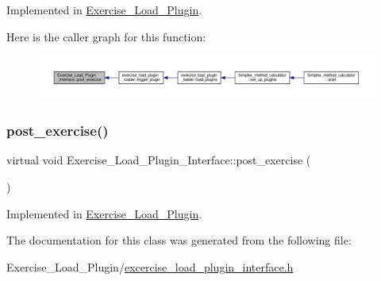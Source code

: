 Implemented in \hyperlink{classExercise__Load__Plugin_ad0c7c810dd492a014e17d40cdfe3d35d}{Exercise\+\_\+\+Load\+\_\+\+Plugin}.

Here is the caller graph for this function\+:\nopagebreak
\begin{figure}[H]
\begin{center}
\leavevmode
\includegraphics[width=350pt]{classExercise__Load__Plugin__Interface_abb9fef00080e48c6ce458b7476db97d9_icgraph}
\end{center}
\end{figure}
\mbox{\label{classExercise__Load__Plugin__Interface_abb9fef00080e48c6ce458b7476db97d9}} 
\subsubsection{\texorpdfstring{post\+\_\+exercise()}{post\_exercise()}\hspace{0.1cm}{\footnotesize\ttfamily [2/2]}}
{\footnotesize\ttfamily virtual void Exercise\+\_\+\+Load\+\_\+\+Plugin\+\_\+\+Interface\+::post\+\_\+exercise (\begin{DoxyParamCaption}\item[{Q\+Standard\+Item\+Model $\ast$}]{ }\end{DoxyParamCaption})\hspace{0.3cm}{\ttfamily [pure virtual]}}



Implemented in \hyperlink{classExercise__Load__Plugin_ad0c7c810dd492a014e17d40cdfe3d35d}{Exercise\+\_\+\+Load\+\_\+\+Plugin}.



The documentation for this class was generated from the following file\+:\begin{DoxyCompactItemize}
\item 
Exercise\+\_\+\+Load\+\_\+\+Plugin/\hyperlink{Exercise__Load__Plugin_2excercise__load__plugin__interface_8h}{excercise\+\_\+load\+\_\+plugin\+\_\+interface.\+h}\end{DoxyCompactItemize}
